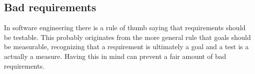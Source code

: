 \subsection{Bad requirements}
In software engineering there is a rule of thumb saying that requirements should be testable. This probably originates from the more general rule that goals should be measurable, recognizing that a requirement is ultimately a goal and a test is a actually a measure. Having this in mind can prevent a fair amount of bad requirements.

